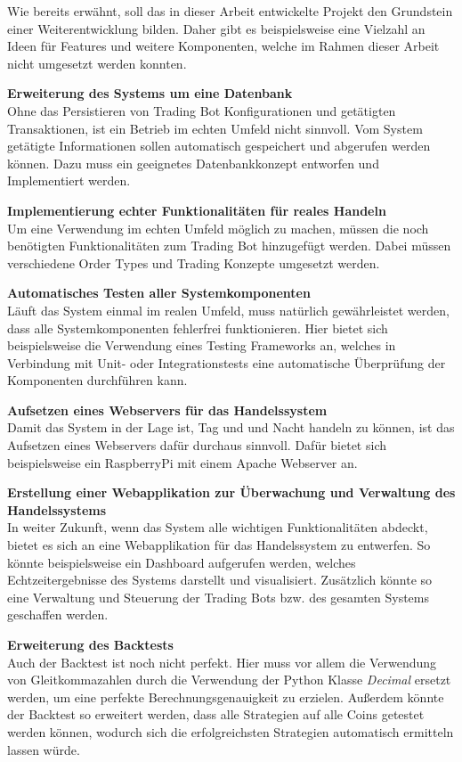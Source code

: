 \documentclass[oneside]{ausarbeitung}
\begin{document}
Wie bereits erwähnt, soll das in dieser Arbeit entwickelte Projekt den Grundstein einer Weiterentwicklung bilden. Daher gibt es beispielsweise eine Vielzahl an Ideen für Features und weitere Komponenten, welche im Rahmen dieser Arbeit nicht umgesetzt werden konnten.

\textbf{Erweiterung des Systems um eine Datenbank} \\
Ohne das Persistieren von Trading Bot Konfigurationen und getätigten Transaktionen, ist ein Betrieb im echten Umfeld nicht sinnvoll. Vom System getätigte Informationen sollen automatisch gespeichert und abgerufen werden können. Dazu muss ein geeignetes Datenbankkonzept entworfen und Implementiert werden.

\textbf{Implementierung echter Funktionalitäten für reales Handeln} \\
Um eine Verwendung im echten Umfeld möglich zu machen, müssen die noch benötigten Funktionalitäten zum Trading Bot hinzugefügt werden. Dabei müssen verschiedene Order Types und Trading Konzepte umgesetzt werden.

\textbf{Automatisches Testen aller Systemkomponenten} \\
Läuft das System einmal im realen Umfeld, muss natürlich gewährleistet werden, dass alle Systemkomponenten fehlerfrei funktionieren. Hier bietet sich beispielsweise die Verwendung eines Testing Frameworks an, welches in Verbindung mit Unit- oder Integrationstests eine automatische Überprüfung der Komponenten durchführen kann.

\textbf{Aufsetzen eines Webservers für das Handelssystem} \\
Damit das System in der Lage ist, Tag und und Nacht handeln zu können, ist das Aufsetzen eines Webservers dafür durchaus sinnvoll. Dafür bietet sich beispielsweise ein RaspberryPi mit einem Apache Webserver an.

\textbf{Erstellung einer Webapplikation zur Überwachung und Verwaltung des Handelssystems} \\
In weiter Zukunft, wenn das System alle wichtigen Funktionalitäten abdeckt, bietet es sich an eine Webapplikation für das Handelssystem zu entwerfen. So könnte beispielsweise ein Dashboard aufgerufen werden, welches Echtzeitergebnisse des Systems darstellt und visualisiert. Zusätzlich könnte so eine Verwaltung und Steuerung der Trading Bots bzw. des gesamten Systems geschaffen werden.

\textbf{Erweiterung des Backtests} \\
Auch der Backtest ist noch nicht perfekt. Hier muss vor allem die Verwendung von Gleitkommazahlen durch die Verwendung der Python Klasse \textit{Decimal} ersetzt werden, um eine perfekte Berechnungsgenauigkeit zu erzielen. Außerdem könnte der Backtest so erweitert werden, dass alle Strategien auf alle Coins getestet werden können, wodurch sich die erfolgreichsten Strategien automatisch ermitteln lassen würde.
\appendix
\end{document}
